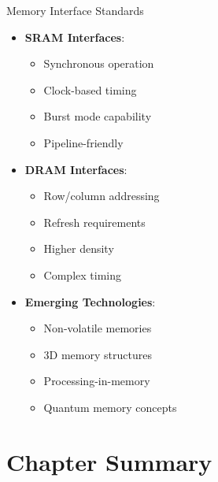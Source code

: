 \documentclass[aspectratio=169,11pt]{beamer}
\newcommand{\concept}[1]{\textbf{\color{accentcolor}#1}}
\begin{document}
\begin{frame}{Memory Interface Standards}
\begin{itemize}
\item \concept{SRAM Interfaces}:
\begin{itemize}
\item Synchronous operation
\item Clock-based timing
\item Burst mode capability
\item Pipeline-friendly
\end{itemize}
\vspace{0.3cm}
\item \concept{DRAM Interfaces}:
\begin{itemize}
\item Row/column addressing
\item Refresh requirements
\item Higher density
\item Complex timing
\end{itemize}
\vspace{0.3cm}
\item \concept{Emerging Technologies}:
\begin{itemize}
\item Non-volatile memories
\item 3D memory structures
\item Processing-in-memory
\item Quantum memory concepts
\end{itemize}
\end{itemize}
\end{frame}

\section{Chapter Summary}
\end{document}
